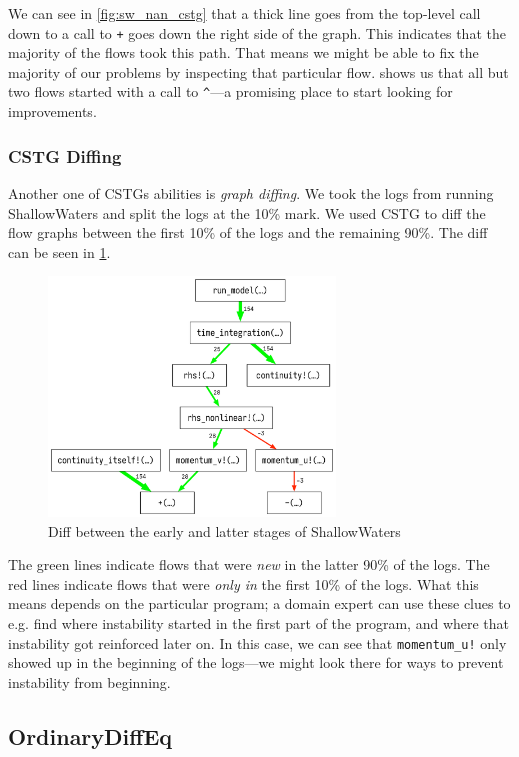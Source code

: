 \documentclass{juliacon}
\begin{document}
We can see in \cref{fig:sw_nan_cstg} that a thick line goes from the top-level call down to a call to \texttt{+} goes down the right side of the graph.
This indicates that the majority of the flows took this path.
That means we might be able to fix the majority of our problems by inspecting that particular flow.
 shows us that all but two flows started with a call to \texttt{^}---a promising place to start looking for improvements.

\subsubsection{CSTG Diffing}

Another one of CSTGs abilities is \emph{graph diffing}.
We took the \FT{} logs from running ShallowWaters and split the logs at the 10\% mark.
We used CSTG to diff the flow graphs between the first 10\% of the logs and the remaining 90\%.
The diff can be seen in \cref{fig:cstg_diff_demo}.

\begin{figure}[ht]
  \centering
  \includegraphics[width=3in]{./fig/cstg_diff_pretty.png}
  \caption{Diff between the early and latter stages of ShallowWaters}
  \label{fig:cstg_diff_demo}
\end{figure}

The green lines indicate flows that were \emph{new} in the latter 90\% of the logs.
The red lines indicate flows that were \emph{only in} the first 10\% of the logs.
What this means depends on the particular program; a domain expert can use these clues to e.g. find where instability started in the first part of the program, and where that instability got reinforced later on.
In this case, we can see that \texttt{momentum_u!} only showed up in the beginning of the logs---we might look there for ways to prevent instability from beginning.

\subsection{OrdinaryDiffEq}
\label{s:ode}
\end{document}
